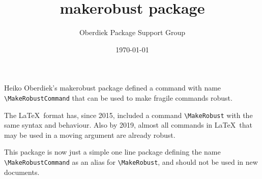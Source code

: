 \documentclass{article}
\title{makerobust package}
\author{Oberdiek Package Support Group}
\date{\today}
\begin{document}
Heiko Oberdiek's \textsf{makerobust} package defined a command with name
\verb|\MakeRobustCommand| that can be used to make fragile commands
robust.

The \LaTeX\ format has, since 2015, included a command
\verb|\MakeRobust| with the same syntax and behaviour.  Also by 2019,
almost all commands in \LaTeX\ that may be used in a moving argument
are already robust.

This package is now just a simple one line package defining the name 
\verb|\MakeRobustCommand| as an alias for \verb|\MakeRobust|, and
should not be used in new documents.
\end{document}
